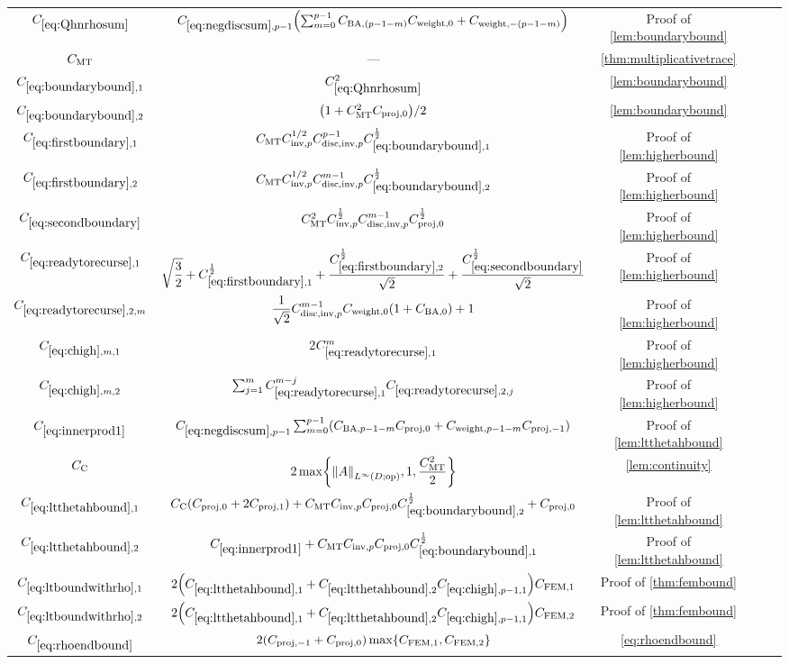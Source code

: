 {\begin{landscape}
\begin{longtabu}{Sc Sc Sc}
  $\Cmess$ &$\Csumpmo \mleft(\sum_{m=0}^{p-1} \CSZfn{(p-1-m)} \Cwfn{0} + \Cwfn{-(p-1-m)}\mright)$&Proof of \cref{lem:boundarybound}\\
  $C_{\mathrm{MT}}$ &---&\cref{thm:multiplicativetrace}\\
  $\Cboundaryo$ & $\Cmess^2$ & \cref{lem:boundarybound} \\
  $\Cboundaryt$ & $\mleft(1 + \CMT^2 \Cmmofn{0}\mright)/2$ & \cref{lem:boundarybound}\\
  $\CBo$&$\CMT \CinvVhp^{1/2} \Chinv^{p-1} \Cboundaryo^{\half} $&Proof of \cref{lem:higherbound}\\
  $\CBt$&$\CMT \CinvVhp^{1/2} \Chinv^{m-1} \Cboundaryt^{\half}$&Proof of \cref{lem:higherbound}\\
  $\CBth$&$C_{\mathrm{MT}}^2 C_{\mathrm{inv},p}^{\frac{1}{2}} C_{\mathrm{disc},\mathrm{inv},p}^{m-1}C_{\mathrm{proj},0}^{\frac{1}{2}}$&Proof of \cref{lem:higherbound}\\
  $\CReco$&$\displaystyle\sqrt{\frac32} + \CBo^{\half} + \frac{\CBt^{\half}}{\sqrt{2}}+ \frac{\CBth^{\half}}{\sqrt{2}}$&Proof of \cref{lem:higherbound}\\
  $\CRectfn{m}$&$\displaystyle\frac1{\sqrt{2}}\Chinv^{m-1}\Cwfn{0}\mleft(1+\CSZfn{0}\mright)+1$&Proof of \cref{lem:higherbound}\\
  $\Chighmo$ & 2$\CReco^m$&Proof of \cref{lem:higherbound}\\
  $\Chighmt$ &$\sum_{j=1}^{m}\CReco^{m-j} \CRectfn{j}$&Proof of \cref{lem:higherbound}\\
  $\Cfourteen$ &$\Csumfn{p-1}\sum_{m=0}^{p-1} \mleft(\CSZfn{p-1-m}\Cmmofn{0} + \Cwfn{p-1-m} \Cmmofn{-1}\mright)$&Proof of \cref{lem:ltthetahbound}\\
    $C_{\mathrm{C}}$&$\displaystyle2\max\set{\NLiDop{A},1,\frac{\CMT^2}2}$&\cref{lem:continuity}\\
  $\Cfirst$ &$\Cc\mleft(\Cmmofn{0} + 2\Cmmofn{1}\mright) + \CMT \CinvVhp \Cmmofn{0} \Cboundaryt^{\half} + \Cmmofn{0}$&Proof of \cref{lem:ltthetahbound}\\
    $\Csecond$ &$\Cfourteen  + \CMT \CinvVhp \Cmmofn{0}\Cboundaryo^{\half}$&Proof of \cref{lem:ltthetahbound}\\
  $\CLtboundo$&$ 2\mleft(\Cfirst + \Csecond\Chighfn{p-1,1}\mright)\CFEMo$&Proof of \cref{thm:fembound}\\
  $\CLtboundt$&$2\mleft(\Cfirst + \Csecond\Chighfn{p-1,1}\mright)\CFEMt$&Proof of \cref{thm:fembound}\\
  $\Crhoendbound$ & $2\mleft(\Cmmofn{-1} + \Cmmofn{0}\mright)\max\set{\CFEMo,\CFEMt}$ & \cref{eq:rhoendbound}\\

\end{longtabu}
\end{landscape}}
